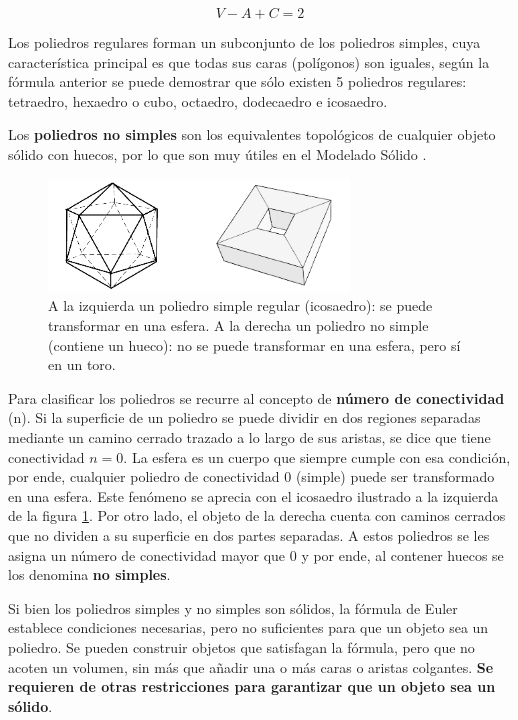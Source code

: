     \begin{equation}
    V - A  +  C = 2
    \label{ec:euler0}
    \end{equation}
    
    Los poliedros regulares forman un subconjunto de los poliedros simples, cuya característica principal es que todas sus caras (polígonos) son iguales, según la fórmula anterior se puede demostrar que sólo existen 5 poliedros regulares: tetraedro, hexaedro o cubo, octaedro, dodecaedro e icosaedro.
    
    
Los \textbf{poliedros no simples} son los equivalentes topológicos de cualquier objeto sólido con huecos, por lo que son muy útiles en el Modelado Sólido \citep{Ramos2011}. 

    \begin{figure}[ht]
    \includegraphics[width=8cm]{Img/GEO/geo-simple-nosimple.png}
    \centering
    \caption{\footnotesize{A la izquierda un poliedro simple regular (icosaedro): se puede transformar en una esfera. A la derecha un poliedro no simple (contiene un hueco): no se puede transformar en una esfera, pero sí en un toro.}}
    \label{fig:polino}
    \end{figure}
    
    Para clasificar los poliedros se recurre al concepto de \textbf{número de conectividad}  (n). Si la superficie de un poliedro se puede dividir en dos regiones separadas mediante un camino cerrado trazado a lo largo de sus aristas, se dice que tiene conectividad $n = 0$. La esfera es un cuerpo que siempre cumple con esa condición, por ende, cualquier poliedro de conectividad $0$ (simple) puede ser transformado en una esfera. Este fenómeno se aprecia con el icosaedro ilustrado a la izquierda de la figura \ref{fig:polino}. 
    Por otro lado, el objeto de la derecha cuenta con caminos cerrados que no dividen a su superficie en dos partes separadas. A estos poliedros se les asigna un número de conectividad mayor que $0$ y por ende, al contener huecos se los denomina \textbf{no simples}.
    
    Si bien los poliedros simples y no simples son sólidos, la fórmula de Euler establece condiciones necesarias, pero no suficientes para que un objeto sea un poliedro. Se pueden construir objetos que satisfagan la fórmula, pero que no acoten un volumen, sin más que añadir una o más caras o aristas colgantes. \textbf{Se requieren de otras restricciones para garantizar que un objeto sea un sólido}.

